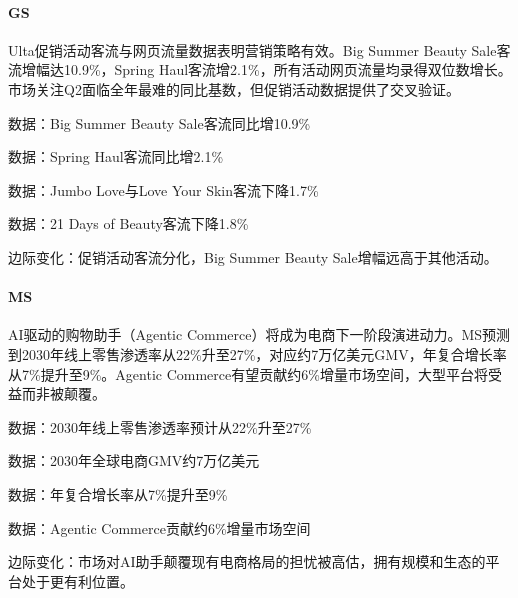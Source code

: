 \documentclass[11pt]{ctexart}
\begin{document}
\paragraph{GS} Ulta促销活动客流与网页流量数据表明营销策略有效。Big Summer Beauty Sale客流增幅达10.9\%，Spring Haul客流增2.1\%，所有活动网页流量均录得双位数增长。市场关注Q2面临全年最难的同比基数，但促销活动数据提供了交叉验证。
{\small\color{refgray}数据：Big Summer Beauty Sale客流同比增10.9\%\par}
{\small\color{refgray}数据：Spring Haul客流同比增2.1\%\par}
{\small\color{refgray}数据：Jumbo Love与Love Your Skin客流下降1.7\%\par}
{\small\color{refgray}数据：21 Days of Beauty客流下降1.8\%\par}
{\small\color{refgray}边际变化：促销活动客流分化，Big Summer Beauty Sale增幅远高于其他活动。\par}
\paragraph{MS} AI驱动的购物助手（Agentic Commerce）将成为电商下一阶段演进动力。MS预测到2030年线上零售渗透率从22\%升至27\%，对应约7万亿美元GMV，年复合增长率从7\%提升至9\%。Agentic Commerce有望贡献约6\%增量市场空间，大型平台将受益而非被颠覆。
{\small\color{refgray}数据：2030年线上零售渗透率预计从22\%升至27\%\par}
{\small\color{refgray}数据：2030年全球电商GMV约7万亿美元\par}
{\small\color{refgray}数据：年复合增长率从7\%提升至9\%\par}
{\small\color{refgray}数据：Agentic Commerce贡献约6\%增量市场空间\par}
{\small\color{refgray}边际变化：市场对AI助手颠覆现有电商格局的担忧被高估，拥有规模和生态的平台处于更有利位置。\par}
\end{document}
